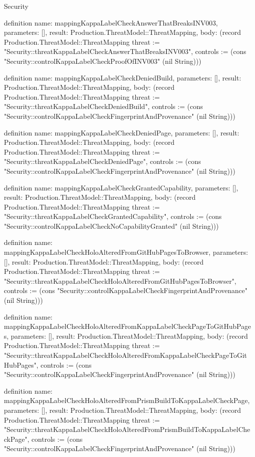 \begin{lexlean}{Security}
\begin{semanticmodule}
definition{
  name: mappingKappaLabelCheckAnswerThatBreaksINV003,
  parameters: [],
  result: Production.ThreatModel::ThreatMapping,
  body: (record Production.ThreatModel::ThreatMapping {threat := "Security::threatKappaLabelCheckAnswerThatBreaksINV003", controls := (cons "Security::controlKappaLabelCheckProofOfINV003" (nil String))})
}

definition{
  name: mappingKappaLabelCheckDeniedBuild,
  parameters: [],
  result: Production.ThreatModel::ThreatMapping,
  body: (record Production.ThreatModel::ThreatMapping {threat := "Security::threatKappaLabelCheckDeniedBuild", controls := (cons "Security::controlKappaLabelCheckFingerprintAndProvenance" (nil String))})
}

definition{
  name: mappingKappaLabelCheckDeniedPage,
  parameters: [],
  result: Production.ThreatModel::ThreatMapping,
  body: (record Production.ThreatModel::ThreatMapping {threat := "Security::threatKappaLabelCheckDeniedPage", controls := (cons "Security::controlKappaLabelCheckFingerprintAndProvenance" (nil String))})
}

definition{
  name: mappingKappaLabelCheckGrantedCapability,
  parameters: [],
  result: Production.ThreatModel::ThreatMapping,
  body: (record Production.ThreatModel::ThreatMapping {threat := "Security::threatKappaLabelCheckGrantedCapability", controls := (cons "Security::controlKappaLabelCheckNoCapabilityGranted" (nil String))})
}

definition{
  name: mappingKappaLabelCheckHoloAlteredFromGitHubPagesToBrowser,
  parameters: [],
  result: Production.ThreatModel::ThreatMapping,
  body: (record Production.ThreatModel::ThreatMapping {threat := "Security::threatKappaLabelCheckHoloAlteredFromGitHubPagesToBrowser", controls := (cons "Security::controlKappaLabelCheckFingerprintAndProvenance" (nil String))})
}

definition{
  name: mappingKappaLabelCheckHoloAlteredFromKappaLabelCheckPageToGitHubPages,
  parameters: [],
  result: Production.ThreatModel::ThreatMapping,
  body: (record Production.ThreatModel::ThreatMapping {threat := "Security::threatKappaLabelCheckHoloAlteredFromKappaLabelCheckPageToGitHubPages", controls := (cons "Security::controlKappaLabelCheckFingerprintAndProvenance" (nil String))})
}

definition{
  name: mappingKappaLabelCheckHoloAlteredFromPrismBuildToKappaLabelCheckPage,
  parameters: [],
  result: Production.ThreatModel::ThreatMapping,
  body: (record Production.ThreatModel::ThreatMapping {threat := "Security::threatKappaLabelCheckHoloAlteredFromPrismBuildToKappaLabelCheckPage", controls := (cons "Security::controlKappaLabelCheckFingerprintAndProvenance" (nil String))})
}


\end{semanticmodule}
\end{lexlean}
